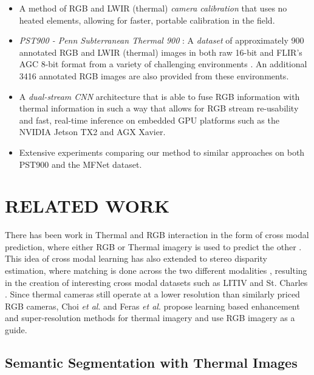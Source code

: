\documentclass[letterpaper, 10 pt, conference]{ieeeconf}
\newcommand{\etal}{\textit{et al}. }
\begin{document}
\begin{itemize}
  \item A method of RGB and LWIR (thermal) \textit{camera calibration} that uses no heated elements, allowing for faster, portable calibration in the field. 
  \item \textit{PST900 - Penn Subterranean Thermal 900} : A \textit{dataset} of approximately 900 annotated RGB and LWIR (thermal) images in both raw 16-bit and FLIR's AGC 8-bit format from a variety of challenging environments \cite{fliragc}. An additional 3416 annotated RGB images are also provided from these environments.
  \item A \textit{dual-stream CNN} architecture that is able to fuse RGB information with thermal information in such a way that allows for RGB stream re-usability and fast, real-time inference on embedded GPU platforms such as the NVIDIA Jetson TX2 and AGX Xavier.
  \item Extensive experiments comparing our method to similar approaches on both PST900 and the MFNet dataset.
\end{itemize}



 
\section{RELATED WORK}

There has been work in Thermal and RGB interaction in the form of cross modal prediction, where either RGB or Thermal imagery is used to predict the other \cite{kniaz2017thermalnet}. This idea of cross modal learning has also extended to stereo disparity estimation, where matching is done across the two different modalities \cite{treible2017cats,beaupre2019siamese}, resulting in the creation of interesting cross modal datasets such as LITIV \cite{torabi2012iterative} and St. Charles \cite{bilodeau2014thermal}. Since thermal cameras still operate at a lower resolution than similarly priced RGB cameras, Choi \etal and Feras \etal propose learning based enhancement \cite{choi2016thermal} and super-resolution methods \cite{almasri2018multimodal} for thermal imagery and use RGB imagery as a guide. \nocite{st2007combination}




\subsection{Semantic Segmentation with Thermal Images}
\end{document}
